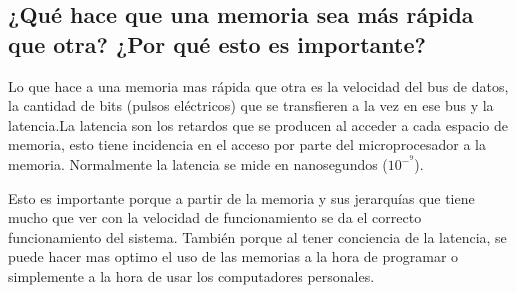 \documentclass{article}
\begin{document}
\subsection{¿Qué hace que una memoria sea más rápida que otra?
¿Por qué esto es importante?}

\vspace{0.5cm}
\noindent
Lo que hace a una memoria mas rápida que otra es la velocidad del bus de datos, la cantidad de bits (pulsos eléctricos) que se transfieren a la vez en ese bus y la latencia.La latencia son los retardos que se producen al acceder a cada espacio de memoria, esto tiene incidencia en el acceso por parte del microprocesador a la memoria. Normalmente la latencia se mide en nanosegundos ($10^-^9$).

\vspace{0.5cm}
\noindent
Esto es importante porque a partir de la memoria y sus jerarquías que tiene mucho que ver con la velocidad de funcionamiento se da el correcto funcionamiento del sistema. También porque al tener conciencia de la latencia, se puede hacer mas optimo el uso de las memorias a la  hora de programar o simplemente a la hora de usar los computadores personales.

 
\newpage


\end{document}

